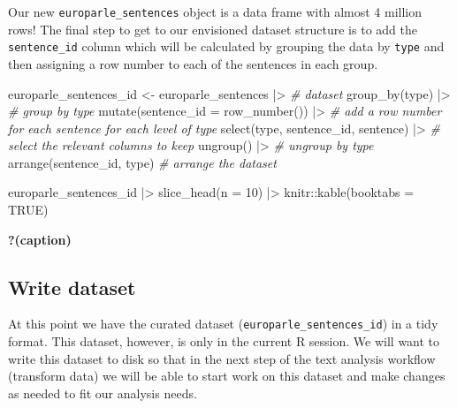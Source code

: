 \documentclass[
  letterpaper,
  DIV=11,
  numbers=noendperiod]{scrreport}
\newenvironment{Shaded}{\begin{snugshade}}{\end{snugshade}}
\newcommand{\AttributeTok}[1]{\textcolor[rgb]{0.00,0.00,0.00}{#1}}
\newcommand{\CommentTok}[1]{\textcolor[rgb]{0.00,0.00,0.00}{\textit{#1}}}
\newcommand{\ConstantTok}[1]{\textcolor[rgb]{0.00,0.00,0.00}{#1}}
\newcommand{\DecValTok}[1]{\textcolor[rgb]{0.00,0.00,0.00}{#1}}
\newcommand{\FunctionTok}[1]{\textcolor[rgb]{0.00,0.00,0.00}{#1}}
\newcommand{\NormalTok}[1]{\textcolor[rgb]{0.00,0.00,0.00}{#1}}
\newcommand{\OtherTok}[1]{\textcolor[rgb]{0.00,0.00,0.00}{#1}}
\newcommand{\SpecialCharTok}[1]{\textcolor[rgb]{0.00,0.00,0.00}{#1}}
\theoremstyle{definition}
\theoremstyle{remark}
\begin{document}
Our new \texttt{europarle\_sentences} object is a data frame with almost
4 million rows! The final step to get to our envisioned dataset
structure is to add the \texttt{sentence\_id} column which will be
calculated by grouping the data by \texttt{type} and then assigning a
row number to each of the sentences in each group.

\begin{Shaded}
\begin{Highlighting}[]
\NormalTok{europarle\_sentences\_id }\OtherTok{\textless{}{-}} 
\NormalTok{  europarle\_sentences }\SpecialCharTok{|\textgreater{}} \CommentTok{\# dataset}
  \FunctionTok{group\_by}\NormalTok{(type) }\SpecialCharTok{|\textgreater{}} \CommentTok{\# group by type}
  \FunctionTok{mutate}\NormalTok{(}\AttributeTok{sentence\_id =} \FunctionTok{row\_number}\NormalTok{()) }\SpecialCharTok{|\textgreater{}} \CommentTok{\# add a row number for each sentence for each level of type}
  \FunctionTok{select}\NormalTok{(type, sentence\_id, sentence) }\SpecialCharTok{|\textgreater{}} \CommentTok{\# select the relevant columns to keep}
  \FunctionTok{ungroup}\NormalTok{() }\SpecialCharTok{|\textgreater{}}  \CommentTok{\# ungroup by type}
  \FunctionTok{arrange}\NormalTok{(sentence\_id, type) }\CommentTok{\# arrange the dataset}

\NormalTok{europarle\_sentences\_id }\SpecialCharTok{|\textgreater{}} 
  \FunctionTok{slice\_head}\NormalTok{(}\AttributeTok{n =} \DecValTok{10}\NormalTok{) }\SpecialCharTok{|\textgreater{}} 
\NormalTok{  knitr}\SpecialCharTok{::}\FunctionTok{kable}\NormalTok{(}\AttributeTok{booktabs =} \ConstantTok{TRUE}\NormalTok{)}
\end{Highlighting}
\end{Shaded}

\begin{table}

\caption{\textbf{?(caption)}}

\end{table}

\hypertarget{write-dataset}{%
\subsection{Write dataset}\label{write-dataset}}

At this point we have the curated dataset
(\texttt{europarle\_sentences\_id}) in a tidy format. This dataset,
however, is only in the current R session. We will want to write this
dataset to disk so that in the next step of the text analysis workflow
(transform data) we will be able to start work on this dataset and make
changes as needed to fit our analysis needs.
\end{document}
